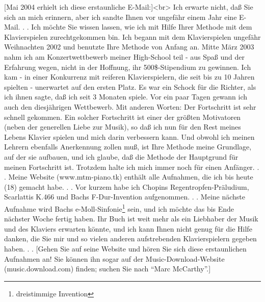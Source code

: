 [Mai 2004 erhielt ich diese erstaunliche E-Mail:]<br>
Ich erwarte nicht, daß Sie sich an mich erinnern, aber ich sandte Ihnen vor ungefähr einem Jahr eine E-Mail. . .
Ich möchte Sie wissen lassen, wie ich mit Hilfe Ihrer Methode mit dem Klavierspielen zurechtgekommen bin.
Ich begann mit dem Klavierspielen ungefähr Weihnachten 2002 und benutzte Ihre Methode von Anfang an.
Mitte März 2003 nahm ich am Konzertwettbewerb meiner High-School teil - aus Spaß und der Erfahrung wegen, nicht in der Hoffnung, ihr 500\$-Stipendium zu gewinnen.
Ich kam - in einer Konkurrenz mit reiferen Klavierspielern, die seit bis zu 10 Jahren spielten - unerwartet auf den ersten Platz.
Es war ein Schock für die Richter, als ich ihnen sagte, daß ich seit 3 Monaten spiele.
Vor ein paar Tagen gewann ich auch den diesjährigen Wettbewerb.
Mit anderen Worten: Der Fortschritt ist sehr schnell gekommen.
Ein solcher Fortschritt ist einer der größten Motivatoren (neben der generellen Liebe zur Musik), 
so daß ich nun für den Rest meines Lebens Klavier spielen und mich darin verbessern kann.
Und obwohl ich meinen Lehrern ebenfalls Anerkennung zollen muß, ist Ihre Methode meine Grundlage, auf der sie aufbauen, und ich glaube, daß die Methode der Hauptgrund für meinen Fortschritt ist.
Trotzdem halte ich mich immer noch für einen Anfänger. . .
Meine Website (www.mtm-piano.tk) enthält alle Aufnahmen, die ich bis heute (18) gemacht habe. . .
Vor kurzem habe ich Chopins Regentropfen-Präludium, Scarlattis K.466 und Bachs F-Dur-Invention aufgenommen. . .
Meine nächste Aufnahme wird Bachs e-Moll-Sinfonie\footnote{dreistimmige Invention} sein, und ich möchte das bis Ende nächster Woche fertig haben.
Ihr Buch ist weit mehr als ein Liebhaber der Musik und des Klaviers erwarten könnte, und ich kann Ihnen nicht genug für die Hilfe danken, die Sie mir und so vielen anderen aufstrebenden Klavierspielern gegeben haben. . .
[Gehen Sie auf seine Website und hören Sie sich diese erstaunlichen Aufnahmen an!
Sie können ihn sogar auf der Music-Download-Website (music.download.com) finden; suchen Sie nach \enquote{Marc McCarthy}.]


